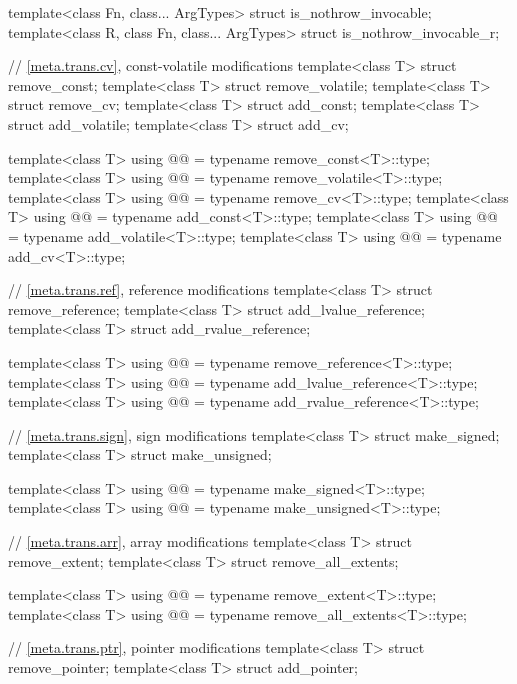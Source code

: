 \begin{codeblock}
{  template<class Fn, class... ArgTypes> struct is_nothrow_invocable;
  template<class R, class Fn, class... ArgTypes> struct is_nothrow_invocable_r;

  // \ref{meta.trans.cv}, const-volatile modifications
  template<class T> struct remove_const;
  template<class T> struct remove_volatile;
  template<class T> struct remove_cv;
  template<class T> struct add_const;
  template<class T> struct add_volatile;
  template<class T> struct add_cv;

  template<class T>
    using @@    = typename remove_const<T>::type;
  template<class T>
    using @@ = typename remove_volatile<T>::type;
  template<class T>
    using @@       = typename remove_cv<T>::type;
  template<class T>
    using @@       = typename add_const<T>::type;
  template<class T>
    using @@    = typename add_volatile<T>::type;
  template<class T>
    using @@          = typename add_cv<T>::type;

  // \ref{meta.trans.ref}, reference modifications
  template<class T> struct remove_reference;
  template<class T> struct add_lvalue_reference;
  template<class T> struct add_rvalue_reference;

  template<class T>
    using @@     = typename remove_reference<T>::type;
  template<class T>
    using @@ = typename add_lvalue_reference<T>::type;
  template<class T>
    using @@ = typename add_rvalue_reference<T>::type;

  // \ref{meta.trans.sign}, sign modifications
  template<class T> struct make_signed;
  template<class T> struct make_unsigned;

  template<class T>
    using @@   = typename make_signed<T>::type;
  template<class T>
    using @@ = typename make_unsigned<T>::type;

  // \ref{meta.trans.arr}, array modifications
  template<class T> struct remove_extent;
  template<class T> struct remove_all_extents;

  template<class T>
    using @@      = typename remove_extent<T>::type;
  template<class T>
    using @@ = typename remove_all_extents<T>::type;

  // \ref{meta.trans.ptr}, pointer modifications
  template<class T> struct remove_pointer;
  template<class T> struct add_pointer;

}
\end{codeblock}
